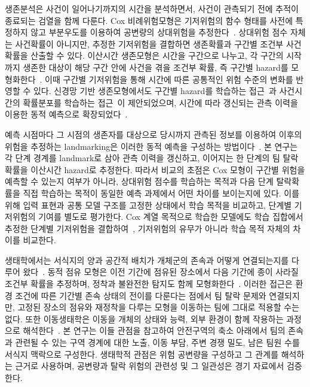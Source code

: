 생존분석은 사건이 일어나기까지의 시간을 분석하면서, 사건이 관측되기 전에 추적이 종료되는 검열을 함께 다룬다.
Cox 비례위험모형은 기저위험의 함수 형태를 사전에 특정하지 않고 부분우도를 이용하여 공변량의 상대위험을 추정한다~\cite{Cox72}.
상대위험 점수 자체는 사건확률이 아니지만, 추정한 기저위험을 결합하면 생존확률과 구간별 조건부 사건확률을 산출할 수 있다.
이산시간 생존모형은 시간을 구간으로 나누고, 각 구간의 시작까지 생존한 대상이 해당 구간 안에 사건을 겪을 조건부 확률, 즉 구간별 hazard를 모형화한다~\cite{SingerWillett93}.
이때 구간별 기저위험을 통해 시간에 따른 공통적인 위험 수준의 변화를 반영할 수 있다.
신경망 기반 생존모형에서도 구간별 hazard를 학습하는 접근~\cite{Gensheimer19,Ren19}과 사건시간의 확률분포를 학습하는 접근~\cite{Lee18}이 제안되었으며, 시간에 따라 갱신되는 관측 이력을 이용한 동적 예측으로 확장되었다~\cite{Lee20}.

예측 시점마다 그 시점의 생존자를 대상으로 당시까지 관측된 정보를 이용하여 이후의 위험을 추정하는 landmarking은 이러한 동적 예측을 구성하는 방법이다~\cite{vanHouwelingen07}.
본 연구는 각 단계 경계를 landmark로 삼아 관측 이력을 갱신하고, 이어지는 한 단계의 팀 탈락확률을 이산시간 hazard로 추정한다.
따라서 비교의 초점은 Cox 모형이 구간별 위험을 예측할 수 있는지 여부가 아니라, 상대위험 점수를 학습하는 목적과 다음 단계 탈락확률을 직접 학습하는 목적이 동일한 예측 과제에서 어떤 차이를 보이는지에 있다.
이를 위해 입력 표현과 공통 모델 구조를 고정한 상태에서 학습 목적을 비교하고, 단계별 기저위험의 기여를 별도로 평가한다.
Cox 계열 목적으로 학습한 모델에도 학습 집합에서 추정한 단계별 기저위험을 결합하여~\cite{PrenticeGloeckler78}, 기저위험의 유무가 아니라 학습 목적 자체의 차이를 비교한다.

생태학에서는 서식지의 양과 공간적 배치가 개체군의 존속과 어떻게 연결되는지를 다루어 왔다~\cite{Fahrig03,Hanski94}.
동적 점유 모형은 이전 기간에 점유된 장소에서 다음 기간에 종이 사라질 조건부 확률을 추정하며, 정착과 불완전한 탐지도 함께 모형화한다~\cite{MacKenzie03}.
이러한 접근은 환경 조건에 따른 기간별 존속 상태의 전이를 다룬다는 점에서 팀 탈락 문제와 연결되지만, 고정된 장소의 점유와 재정착을 다루는 모형을 이동하는 팀에 그대로 적용할 수는 없다.
또한 이동생태학은 이동을 개체의 상태와 능력, 외부 환경이 함께 작용하는 과정으로 해석한다~\cite{Nathan08}.
본 연구는 이들 관점을 참고하여 안전구역의 축소 아래에서 팀의 존속과 관련될 수 있는 구역 경계에 대한 노출, 이동 부담, 주변 경쟁 밀도, 남은 팀원 수를 서식지 맥락으로 구성한다.
생태학적 관점은 위험 공변량을 구성하고 그 관계를 해석하는 근거로 사용하며, 공변량과 탈락 위험의 관련성 및 그 일관성은 경기 자료에서 검증한다.

